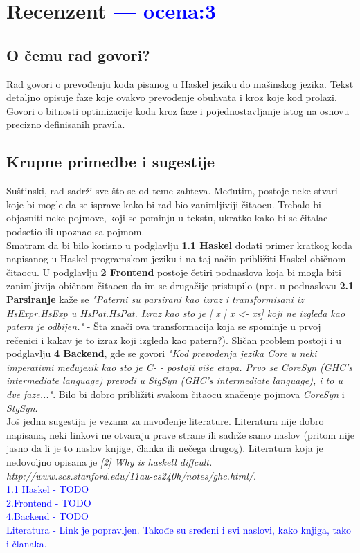 \documentclass[a4paper]{report}
\newcommand{\odgovor}[1]{\textcolor{blue}{#1}}
\begin{document}
	\chapter{Recenzent \odgovor{--- ocena:3} }
	
	
	\section{O čemu rad govori?}
	Rad govori o prevođenju koda pisanog u Haskel jeziku do mašinskog jezika. Tekst detaljno opisuje faze koje ovakvo prevođenje obuhvata i kroz koje kod prolazi. Govori o bitnosti optimizacije koda kroz faze i pojednostavljanje istog na osnovu precizno definisanih pravila. 
	
	\section{Krupne primedbe i sugestije}
	Suštinski, rad sadrži sve što se od teme zahteva. Međutim, postoje neke stvari koje bi mogle da se isprave kako bi rad bio zanimljiviji čitaocu. Trebalo bi objasniti neke pojmove, koji se pominju u tekstu, ukratko kako bi se čitalac podsetio ili upoznao sa pojmom. \\ Smatram da bi bilo korisno u podglavlju \textbf{1.1 Haskel} dodati primer kratkog koda napisanog u Haskel programskom jeziku i na taj način približiti Haskel običnom čitaocu. U podglavlju \textbf{2 Frontend} postoje četiri podnaslova koja bi mogla biti zanimljivija običnom čitaocu da im se drugačije pristupilo (npr. u podnaslovu \textbf{2.1 Parsiranje} kaže se \textit{"Paterni su parsirani kao izraz i transformisani iz HsExpr.HsExp u HsPat.HsPat. Izraz kao sto je [ x | x <- xs] koji ne izgleda kao patern je odbijen."} - Šta znači ova transformacija koja se spominje u prvoj rečenici i kakav je to izraz koji izgleda kao patern?). Sličan problem postoji i u podglavlju \textbf{4 Backend}, gde se govori \textit{"Kod prevodenja jezika Core u neki imperativni međujezik kao sto je
		C- - postoji više etapa. Prvo se CoreSyn (GHC's intermediate language) prevodi u StgSyn (GHC's intermediate language), i to u dve faze..."}. Bilo bi dobro približiti svakom čitaocu značenje pojmova \textit{CoreSyn} i \textit{StgSyn}.\\
	Još jedna sugestija je vezana za navođenje literature. Literatura nije dobro napisana, neki linkovi ne otvaraju prave strane ili sadrže samo naslov (pritom nije jasno da li je to naslov knjige, članka ili nečega drugog). Literatura koja je nedovoljno opisana je \textit{[2] Why is haskell diffcult. http://www.scs.stanford.edu/11au-cs240h/notes/ghc.html/}.\\ 
	\odgovor{1.1 Haskel - TODO\\2.Frontend - TODO\\4.Backend - TODO\\Literatura - Link je popravljen. Takođe su sređeni i svi naslovi, kako knjiga, tako i članaka.}
	
\end{document}
